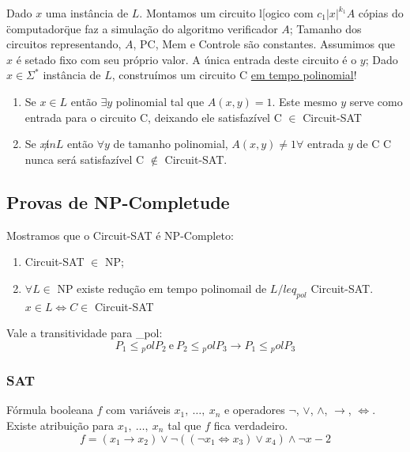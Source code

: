 \documentclass[a4paper,oneside,article,table]{article}
\begin{document}
            Dado $x$ uma instância de $L$. Montamos um circuito l[ogico com $c_1|x|^{k_1}A$ cópias do \"computador\" que faz a simulação do algoritmo verificador $A$;
            Tamanho dos circuitos representando, $A$, PC, Mem e Controle são constantes.
            Assumimos que $x$ é setado fixo com seu próprio valor.
            A única entrada deste circuito é o $y$;
            Dado $x \in \Sigma^*$ instância de $L$, construímos um circuito C \underline{em tempo polinomial}!
            \begin{enumerate}
                \item Se $x \in L$ então $\exists y$ polinomial tal que $A(x,y) = 1$. Este mesmo $y$ serve como entrada para o circuito C, deixando ele satisfazível \rightarrow C $\in$ Circuit-SAT
                \item Se $x \not in L$ então $\forall y$ de tamanho polinomial, $A(x,y) \neq 1 \forall$ entrada $y$ de C \rightarrow C nunca será satisfazível \rightarrow C $\notin$ Circuit-SAT.
            \end{enumerate}

            \subsection{Provas de NP-Completude}
            Mostramos que o Circuit-SAT é  NP-Completo:
            \begin{enumerate}
                \item Circuit-SAT $\in$ NP;
                \item $\forall L \in$ NP existe redução em tempo polinomail de $L /{leq}_{pol}$ Circuit-SAT.\\
                    $x \in L \iff C \in$ Circuit-SAT
            \end{enumerate}

            Vale a transitividade para {\leq}_{pol}:
            \begin{equation*}
                P_1 {\leq}{_pol} P_2~\mathrm{e}~P_2 {\leq}{_pol} P_3 \rightarrow P_1 {\leq}{_pol} P_3
            \end{equation*}

            \subsubsection{SAT}
            Fórmula booleana $f$ com variáveis $x_1,~\ldots,~x_n$ e operadores $\lnot$, $\lor$, $\land$, $\rightarrow$, $\iff$. 
            Existe atribuição para $x_1,~\ldots,~x_n$ tal que $f$ fica verdadeiro.
            \[f = (x_1 \rightarrow x_2) \lor \lnot ( (\lnot x_1 \iff x_3) \lor x_4) \land  \lnot x-2\]
\end{document}
